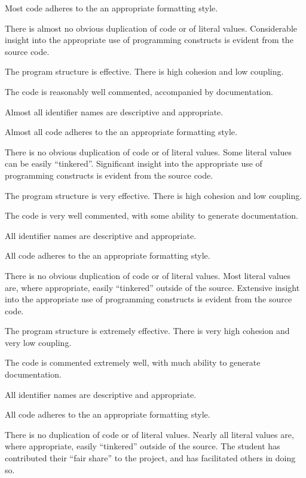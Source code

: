 \documentclass{../../fal_assignment}
\begin{document}
\begin{markingrubric}
            \par Most code adheres to the an appropriate formatting style.
             \par There is almost no obvious duplication of code or of literal values.
        \grade Considerable insight into the appropriate use of programming constructs is evident from the source code.
            \par The program structure is effective. There is high cohesion and low coupling.
            \par The code is reasonably well commented, accompanied by documentation.
            \par Almost all identifier names are descriptive and appropriate.
            \par Almost all code adheres to the an appropriate formatting style.
             \par There is no obvious duplication of code or of literal values. Some literal values can be easily ``tinkered''. 
        \grade Significant insight into the appropriate use of programming constructs is evident from the source code.
            \par The program structure is very effective. There is high cohesion and low coupling.
            \par The code is very well commented, with some ability to generate documentation.
            \par All identifier names are descriptive and appropriate.
            \par All code adheres to the an appropriate formatting style.
             \par There is no obvious duplication of code or of literal values. Most literal values are, where appropriate, easily ``tinkered'' outside of the source.  
        \grade Extensive insight into the appropriate use of programming constructs is evident from the source code.
            \par The program structure is extremely effective. There is very high cohesion and very low coupling.
            \par The code is commented extremely well, with much ability to generate documentation.
            \par All identifier names are descriptive and appropriate.
            \par All code adheres to the an appropriate formatting style.
            \par There is no duplication of code or of literal values. Nearly all literal values are, where appropriate, easily ``tinkered'' outside of the source.  
%
        \grade The student has contributed their ``fair share'' to the project,
            and has facilitated others in doing so.
\end{markingrubric}
\end{document}
